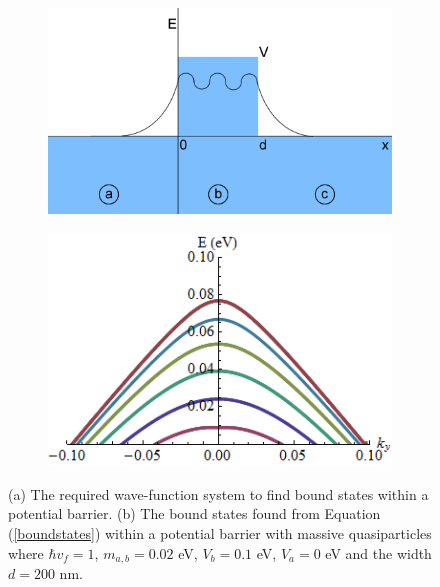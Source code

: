 \begin{figure}
	\begin{subfigure}{0.45\textwidth}
		\centerline{\includegraphics[scale=0.4]{images/bound-states}}
		\caption{}
		\label{}
	\end{subfigure}
	\hspace{1.2cm}
	\begin{subfigure}{0.45\textwidth}
		\centerline{\includegraphics[scale=0.7]{images/bound-states-plot}}
		\caption{}
		\label{}
	\end{subfigure}
	\caption{(a) The required wave-function system to find bound states within a potential barrier. (b) The bound states found from Equation (\ref{boundstates}) within a potential barrier with massive quasiparticles where $\hbar v_{f}=1$, $m_{a,b}=0.02$ eV, $V_{b}=0.1$ eV, $V_{a}=0$ eV and the width $d=200$ nm.}
	\label{bound-states}
\end{figure}
